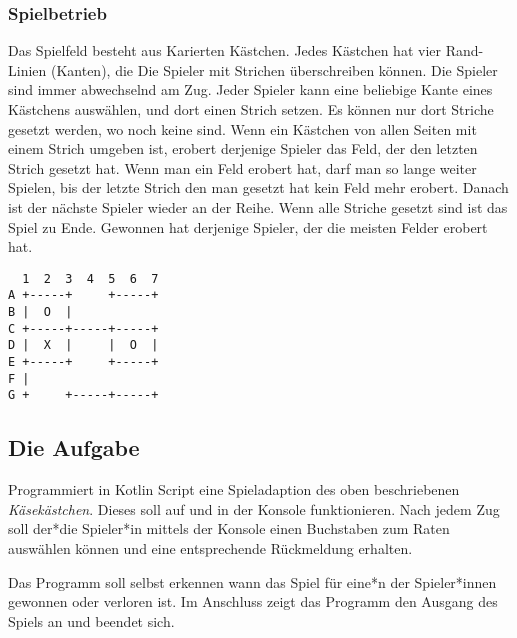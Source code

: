 \subsubsection*{Spielbetrieb}
\begin{minipage}[t]{.7\textwidth}
    Das Spielfeld besteht aus Karierten Kästchen. Jedes Kästchen hat vier Rand-Linien (Kanten), die Die Spieler mit Strichen überschreiben können.
    Die Spieler sind immer abwechselnd am Zug. Jeder Spieler kann eine beliebige Kante eines Kästchens auswählen, und dort einen Strich setzen. Es können nur dort Striche gesetzt werden, wo noch keine sind. Wenn ein Kästchen von allen Seiten mit einem Strich umgeben ist, erobert derjenige Spieler das Feld, der den letzten Strich gesetzt hat. Wenn man ein Feld erobert hat, darf man so lange weiter Spielen, bis der letzte Strich den man gesetzt hat kein Feld mehr erobert. Danach ist der nächste Spieler wieder an der Reihe.
    Wenn alle Striche gesetzt sind ist das Spiel zu Ende. Gewonnen hat derjenige Spieler, der die meisten Felder erobert hat.
\end{minipage}%
\begin{minipage}[t]{.3\textwidth}%
    \centering%
    \captionsetup{type=figure}
    \begin{BVerbatim}
  1  2  3  4  5  6  7
A +-----+     +-----+
B |  O  |
C +-----+-----+-----+
D |  X  |     |  O  |
E +-----+     +-----+
F |
G +     +-----+-----+
    \end{BVerbatim}
\end{minipage}%

\subsection*{Die Aufgabe}
Programmiert in Kotlin Script eine Spieladaption des oben beschriebenen \emph{Käsekästchen}.
Dieses soll auf und in der Konsole funktionieren.
Nach jedem Zug soll der*die Spieler*in mittels der Konsole einen Buchstaben zum Raten auswählen können und eine entsprechende Rückmeldung erhalten.

Das Programm soll selbst erkennen wann das Spiel für eine*n der Spieler*innen gewonnen oder verloren ist.
Im Anschluss zeigt das Programm den Ausgang des Spiels an und beendet sich.


